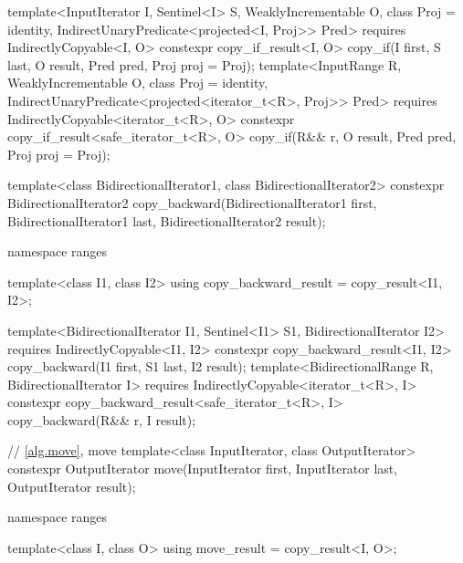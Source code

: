 \begin{addedblock}
\begin{codeblock}
{    template<InputIterator I, Sentinel<I> S, WeaklyIncrementable O, class Proj = identity,
        IndirectUnaryPredicate<projected<I, Proj>> Pred>
      requires IndirectlyCopyable<I, O>
      constexpr copy_if_result<I, O>
        copy_if(I first, S last, O result, Pred pred, Proj proj = Proj{});
    template<InputRange R, WeaklyIncrementable O, class Proj = identity,
        IndirectUnaryPredicate<projected<iterator_t<R>, Proj>> Pred>
      requires IndirectlyCopyable<iterator_t<R>, O>
      constexpr copy_if_result<safe_iterator_t<R>, O>
        copy_if(R&& r, O result, Pred pred, Proj proj = Proj{});
  }
\end{codeblock}\end{addedblock}\begin{codeblock}
  template<class BidirectionalIterator1, class BidirectionalIterator2>
    constexpr BidirectionalIterator2
      copy_backward(BidirectionalIterator1 first, BidirectionalIterator1 last,
                    BidirectionalIterator2 result);
\end{codeblock}\begin{addedblock}\begin{codeblock}
  namespace ranges {
    template<class I1, class I2>
    using copy_backward_result = copy_result<I1, I2>;

    template<BidirectionalIterator I1, Sentinel<I1> S1, BidirectionalIterator I2>
      requires IndirectlyCopyable<I1, I2>
      constexpr copy_backward_result<I1, I2>
        copy_backward(I1 first, S1 last, I2 result);
    template<BidirectionalRange R, BidirectionalIterator I>
      requires IndirectlyCopyable<iterator_t<R>, I>
      constexpr copy_backward_result<safe_iterator_t<R>, I>
        copy_backward(R&& r, I result);
  }
\end{codeblock}\end{addedblock}\begin{codeblock}

  // \ref{alg.move}, move
  template<class InputIterator, class OutputIterator>
    constexpr OutputIterator move(InputIterator first, InputIterator last,
                                  OutputIterator result);
\end{codeblock}\begin{addedblock}\begin{codeblock}
  namespace ranges {
    template<class I, class O>
    using move_result = copy_result<I, O>;

}
\end{codeblock}
\end{addedblock}
